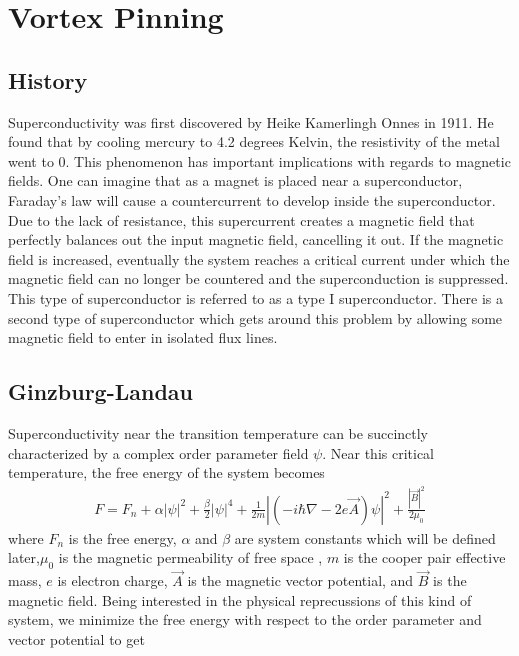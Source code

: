\chapter{Vortex Pinning}
\label{theoryvortex}

\section{History}
	Superconductivity was first discovered by Heike Kamerlingh Onnes in 1911. He found that by cooling mercury to 4.2 degrees Kelvin, the resistivity of the metal went to 0. This phenomenon has important implications with regards to magnetic fields. One can imagine that as a magnet is placed near a superconductor, Faraday's law will cause a countercurrent to develop inside the superconductor. Due to the lack of resistance, this supercurrent creates a magnetic field that perfectly balances out the input magnetic field, cancelling it out. If the magnetic field is increased, eventually the system reaches a critical current under which the magnetic field can no longer be countered and the superconduction is suppressed. This type of superconductor is referred to as a type I superconductor. There is a second type of superconductor which gets around this problem by allowing some magnetic field to enter in isolated flux lines.

\section{Ginzburg-Landau}
Superconductivity near the transition temperature can be succinctly characterized by a complex order parameter field $\psi$. Near this critical temperature, the free energy of the system becomes
\begin{eqnarray}
F = F_n + \alpha |\psi|^2 + \frac {\beta} {2} |\psi|^4 + \frac {1} {2m} |(-i \hbar \nabla - 2 e \overrightarrow A) \psi|^2 + \frac {|\overrightarrow B |^2} {2 \mu_0}
\label{freeE}
\end{eqnarray}
where $F_n$ is the free energy, $\alpha$ and $\beta$ are system constants which will be defined later,$\mu_0$ is the magnetic permeability of free space , $m$ is the cooper pair effective mass, $e$ is electron charge, $\overrightarrow A$ is the magnetic vector potential, and $\overrightarrow B$ is the magnetic field. Being interested in the physical reprecussions of this kind of system, we minimize the free energy with respect to the order parameter and vector potential to get

